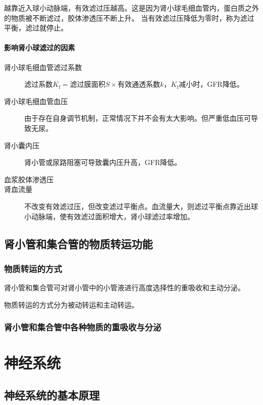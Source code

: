 越靠近入球小动脉端，有效滤过压越高。这是因为肾小球毛细血管内，蛋白质之外的物质被不断滤过，胶体渗透压不断上升。
当有效滤过压降低为零时，称为滤过平衡，滤过就停止。

\paragraph{影响肾小球滤过的因素}

\begin{description}
	\item[肾小球毛细血管滤过系数] $\text{滤过系数}K_{\text{f}}=\text{滤过膜面积}S\times\text{有效通透系数}k$，$K_{\text{f}}$减小时，GFR降低。
	\item[肾小球毛细血管血压] 由于存在自身调节机制，正常情况下并不会有太大影响。但严重低血压可导致无尿。
	\item[肾小囊内压] 肾小管或尿路阻塞可导致囊内压升高，GFR降低。
	\item[血浆胶体渗透压]
	\item[肾血流量] 不改变有效滤过压，但改变滤过平衡点。血流量大，则滤过平衡点靠近出球小动脉端，使有效滤过面积增大，肾小球滤过率增加。
\end{description}

\subsection{肾小管和集合管的物质转运功能}

\subsubsection{物质转运的方式}

肾小管和集合管可对肾小管中的小管液进行高度选择性的重吸收和主动分泌。

物质转运的方式分为被动转运和主动转运。

\subsubsection{肾小管和集合管中各种物质的重吸收与分泌}



\section{神经系统}

\subsection{神经系统的基本原理}

